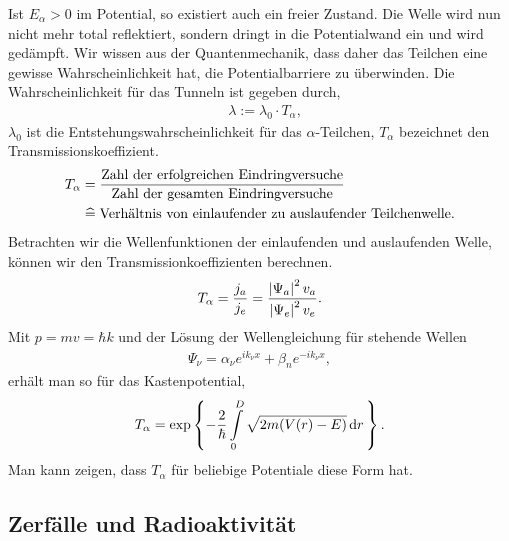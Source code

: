 Ist $E_\alpha > 0$ im Potential, so existiert auch ein freier Zustand.
Die Welle wird nun nicht mehr total reflektiert, sondern dringt in die
Potentialwand ein und wird gedämpft. Wir wissen aus der Quantenmechanik,
dass daher das Teilchen eine gewisse Wahrscheinlichkeit hat, die
Potentialbarriere zu überwinden. Die Wahrscheinlichkeit für das Tunneln ist
gegeben durch,
\begin{align*}
&\lambda := \lambda_0\cdot T_\alpha,
\end{align*}
$\lambda_0$ ist die Entstehungswahrscheinlichkeit für das
$\alpha$-Teilchen, $T_\alpha$ bezeichnet den Transmissionskoeffizient.
\begin{align*}
T_\alpha &= \frac{\text{Zahl der erfolgreichen Eindringversuche}}{\text{Zahl
der gesamten Eindringversuche}}\\
&\mathrel{\widehat{=}} \text{Verhältnis von einlaufender zu auslaufender Teilchenwelle}.
\end{align*}
Betrachten wir die Wellenfunktionen der einlaufenden und auslaufenden Welle,
können wir den Transmissionkoeffizienten berechnen.
\begin{align*}
T_\alpha = \frac{j_a}{j_e} = \frac{\left|\Psi_a\right|^2v_a}{\left|\Psi_e\right|^2v_e}.
\end{align*}
Mit $p=mv = \hbar k$ und der Lösung der Wellengleichung für stehende
Wellen
\begin{align*}
\Psi_\nu = \alpha_\nu e^{ik_\nu x} + \beta_n e^{-ik_\nu x},
\end{align*}
erhält man so für das Kastenpotential,
\begin{align*}
T_\alpha = \exp\left\{ -\frac{2}{\hbar}\int\limits_0^D \sqrt{2m(V(r)-E)}\,\mathrm{d} r\, \right\}.
\end{align*}
Man kann zeigen, dass $T_\alpha$ für beliebige Potentiale diese Form hat.

\subsection{Zerfälle und Radioaktivität}

